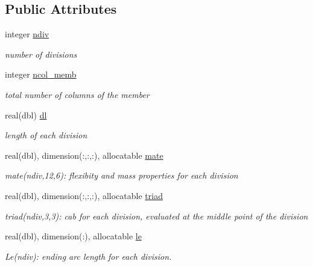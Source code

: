 \subsection*{Public Attributes}
\begin{DoxyCompactItemize}
\item 
integer \hyperlink{structinternaldata_1_1memberinf_a2af474d1d2e3a33ab9b4c932575a2294}{ndiv}
\begin{DoxyCompactList}\small\item\em number of divisions \end{DoxyCompactList}\item 
integer \hyperlink{structinternaldata_1_1memberinf_abff7a37a6411bc3bd96131bfccf98e91}{ncol\+\_\+memb}
\begin{DoxyCompactList}\small\item\em total number of columns of the member \end{DoxyCompactList}\item 
real(dbl) \hyperlink{structinternaldata_1_1memberinf_ace9954daa2b77364ae4984df951fa4d3}{dl}
\begin{DoxyCompactList}\small\item\em length of each division \end{DoxyCompactList}\item 
real(dbl), dimension(\+:,\+:,\+:), allocatable \hyperlink{structinternaldata_1_1memberinf_a992b8e0a6f7e01d33329d4cf9ee5737f}{mate}
\begin{DoxyCompactList}\small\item\em mate(ndiv,12,6)\+: flexibity and mass properties for each division \end{DoxyCompactList}\item 
real(dbl), dimension(\+:,\+:,\+:), allocatable \hyperlink{structinternaldata_1_1memberinf_aedb5a98d6a0011605f5458f065019a01}{triad}
\begin{DoxyCompactList}\small\item\em triad(ndiv,3,3)\+: cab for each division, evaluated at the middle point of the division \end{DoxyCompactList}\item 
real(dbl), dimension(\+:), allocatable \hyperlink{structinternaldata_1_1memberinf_a4328603e20b1c327a37c30020048d96f}{le}
\begin{DoxyCompactList}\small\item\em Le(ndiv)\+: ending arc length for each division. \end{DoxyCompactList}\item 

\end{DoxyCompactItemize}
